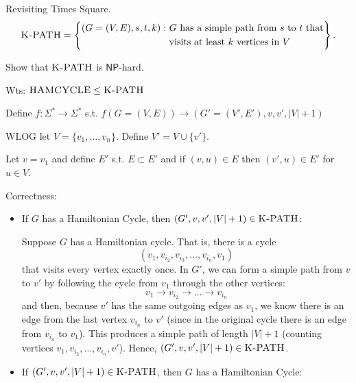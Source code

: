 \documentclass[12pt, letterpaper]{article}
\newcommand{\NP}{\mathsf{NP}}
\begin{document}
\newcommand{\KPATH}{\textsc{K-PATH}}
\begin{problem}{Revisiting Times Square.}
    \[
    \KPATH = \left\{
\begin{aligned}
(G=(V,E),s,t,k) :~ &\text{$G$ has a simple path from $s$ to $t$ that}\\
&\text{visits at least $k$ vertices in $V$}
\end{aligned}
\right\}.
\]
\end{problem}
\begin{subproblem}{}
    Show that $\KPATH$ is $\NP$-hard.
\end{subproblem}
\newcommand{\HAM}{\textsc{HAMCYCLE}}
\begin{problemproof}
    Wts: $\HAM \leq \KPATH$

    Define $f: \Sigma^* \to \Sigma^*$ s.t. $f(G=(V,E)) \to (G'=(V',E'),v,v',|V|+1)$

    WLOG let $V=\{v_1,\dots,v_n\}$. Define $V'=V \cup \{v'\}$.
    
    Let $v=v_1$ and define $E'$ s.t. $E \subset E'$ and if $(v,u) \in E$ then $(v',u) \in E'$ for $u \in V$.

    Correctness:

    \begin{itemize}
        \item If \(G\) has a Hamiltonian Cycle, then \((G',v,v',|V|+1) \in \KPATH\):
    
        Suppose \(G\) has a Hamiltonian cycle. That is, there is a cycle
            \[
            (v_1, v_{i_2}, v_{i_3}, \dots, v_{i_n}, v_1)
            \]
            that visits every vertex exactly once.
        In \(G'\), we can form a simple path from \(v\) to \(v'\) by following the cycle from \(v_1\) through the other vertices:
            \[
            v_1 \to v_{i_2} \to \dots \to v_{i_n}
            \]
            and then, because \(v'\) has the same outgoing edges as \(v_1\), we know there is an edge from the last vertex \(v_{i_n}\) to \(v'\) (since in the original cycle there is an edge from \(v_{i_n}\) to \(v_1\)).
        This produces a simple path of length \(|V|+1\) (counting vertices \(v_1, v_{i_2}, \dots, v_{i_n}, v'\)).
        Hence, \((G',v,v',|V|+1) \in \KPATH\).
    
        \item If \((G',v,v',|V|+1) \in \KPATH\), then \(G\) has a Hamiltonian Cycle:
    

\end{itemize}
\end{problemproof}
\end{document}
